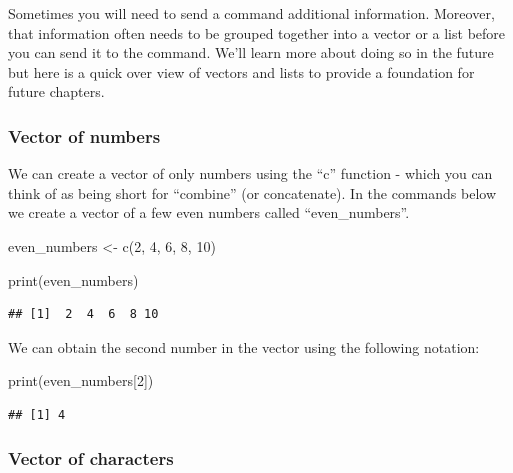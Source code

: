 \documentclass[
]{krantz}
\makeatletter
\newenvironment{Shaded}{\begin{snugshade}}{\end{snugshade}}
\newcommand{\DecValTok}[1]{\textcolor[rgb]{0.06,0.06,0.06}{#1}}
\newcommand{\FunctionTok}[1]{\textcolor[rgb]{0,0,0}{#1}}
\newcommand{\NormalTok}[1]{#1}
\newcommand{\OtherTok}[1]{\textcolor[rgb]{0.37,0.37,0.37}{#1}}
\newenvironment{kframe}{%
\medskip{}
\setlength{\fboxsep}{.8em}
 \def\at@end@of@kframe{}%
 \ifinner\ifhmode%
  \def\at@end@of@kframe{\end{minipage}}%
  \begin{minipage}{\columnwidth}%
 \fi\fi%
 \def\FrameCommand##1{\hskip\@totalleftmargin \hskip-\fboxsep
 \colorbox{shadecolor}{##1}\hskip-\fboxsep
     \hskip-\linewidth \hskip-\@totalleftmargin \hskip\columnwidth}%
 \MakeFramed {\advance\hsize-\width
   \@totalleftmargin\z@ \linewidth\hsize
   \@setminipage}}%
 {\par\unskip\endMakeFramed%
 \at@end@of@kframe}
\renewenvironment{Shaded}{\begin{kframe}}{\end{kframe}}
\makeatother
\begin{document}
Sometimes you will need to send a command additional information. Moreover, that information often needs to be grouped together into a vector or a list before you can send it to the command. We'll learn more about doing so in the future but here is a quick over view of vectors and lists to provide a foundation for future chapters.

\hypertarget{vector-of-numbers}{%
\subsubsection{Vector of numbers}\label{vector-of-numbers}}

We can create a vector of only numbers using the ``c'' function - which you can think of as being short for ``combine'' (or concatenate). In the commands below we create a vector of a few even numbers called ``even\_numbers''.

\begin{Shaded}
\begin{Highlighting}[]
\NormalTok{even\_numbers }\OtherTok{\textless{}{-}} \FunctionTok{c}\NormalTok{(}\DecValTok{2}\NormalTok{, }\DecValTok{4}\NormalTok{, }\DecValTok{6}\NormalTok{, }\DecValTok{8}\NormalTok{, }\DecValTok{10}\NormalTok{)}
\end{Highlighting}
\end{Shaded}

\begin{Shaded}
\begin{Highlighting}[]
\FunctionTok{print}\NormalTok{(even\_numbers)}
\end{Highlighting}
\end{Shaded}

\begin{verbatim}
## [1]  2  4  6  8 10
\end{verbatim}

We can obtain the second number in the vector using the following notation:

\begin{Shaded}
\begin{Highlighting}[]
\FunctionTok{print}\NormalTok{(even\_numbers[}\DecValTok{2}\NormalTok{])}
\end{Highlighting}
\end{Shaded}

\begin{verbatim}
## [1] 4
\end{verbatim}

\hypertarget{vector-of-characters}{%
\subsubsection{Vector of characters}\label{vector-of-characters}}
\end{document}
